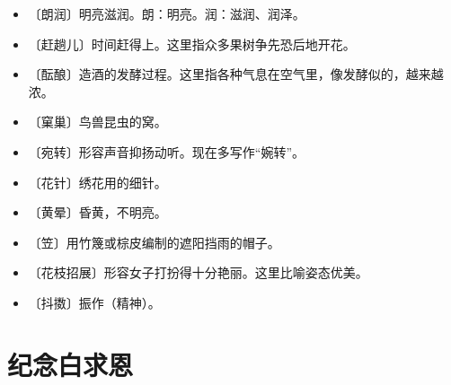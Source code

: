 \documentclass[12pt,UTF-8,openany]{ctexbook}
\begin{document}
\begin{itemize}
    \setlength\itemsep{-0.2em}
    \item 〔朗润〕明亮滋润。朗：明亮。润：滋润、润泽。
    \item 〔赶趟儿〕时间赶得上。这里指众多果树争先恐后地开花。
    \item 〔酝酿〕造酒的发酵过程。这里指各种气息在空气里，像发酵似的，越来越浓。
    \item 〔窠巢〕鸟兽昆虫的窝。
    \item 〔宛转〕形容声音抑扬动听。现在多写作“婉转”。
    \item 〔花针〕绣花用的细针。
    \item 〔黄晕〕昏黄，不明亮。
    \item 〔笠〕用竹篾或棕皮编制的遮阳挡雨的帽子。
    \item 〔花枝招展〕形容女子打扮得十分艳丽。这里比喻姿态优美。
    \item 〔抖擞〕振作（精神）。
\end{itemize}

\chapter{纪念白求恩}
\end{document}
